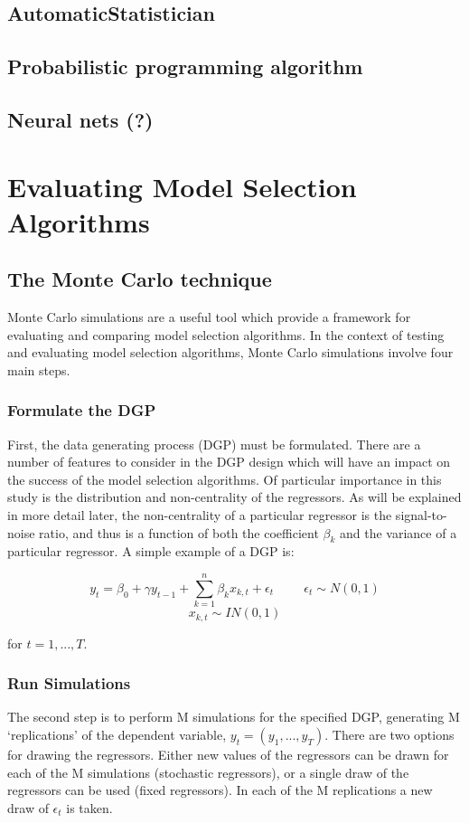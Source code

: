 \documentclass[11pt, oneside]{book}   	%
\begin{document}
\section{AutomaticStatistician}
\section{Probabilistic programming algorithm}
\section{Neural nets (?)}


\chapter{Evaluating Model Selection Algorithms}

\section{The Monte Carlo technique}

Monte Carlo simulations are a useful tool which provide a framework for evaluating and comparing model selection algorithms. In the context of testing and evaluating model selection algorithms, Monte Carlo simulations involve four main steps. 

\subsection{Formulate the DGP} 
First, the data generating process (DGP) must be formulated. There are a number of features to consider in the DGP design which will have an impact on the success of the model selection algorithms. Of particular importance in this study is the distribution and non-centrality of the regressors. As will be explained in more detail later, the non-centrality of a particular regressor is the signal-to-noise ratio, and thus is a function of both the coefficient $\beta_{k}$ and the variance of a particular regressor. A simple example of a DGP is:


$$y_{t}=\beta_{0} + \gamma y_{t-1}+\sum_{k=1}^{n}\beta_{k}x_{k,t} + \epsilon_{t} \hspace{1cm} \epsilon_{t} \sim N(0, 1) $$
$$x_{k,t} \sim IN(0, 1) $$

for $t=1,...,T$. 



\subsection{Run Simulations}
The second step is to perform M simulations for the specified DGP, generating M `replications' of the dependent variable, $y_{t}=(y_{1},...,y_{T})$. There are two options for drawing the regressors. Either new values of the regressors can be drawn for each of the M simulations (stochastic regressors), or a single draw of the regressors can be used (fixed regressors). In each of the M replications a new draw of $\epsilon_{t}$ is taken.
\end{document}
